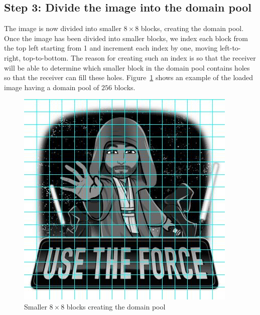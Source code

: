 \documentclass[10pt,twocolumn]{witseiepaper}
\begin{document}
\subsection{Step 3: Divide the image into the domain pool}
\label{sec: Step 3}
The image is now divided into smaller $8\times 8$ blocks, creating the domain pool. Once the image has been divided into smaller blocks, we index each block from the top left starting from 1 and increment each index by one, moving left-to-right, top-to-bottom. The reason for creating such an index is so that the receiver will be able to determine which smaller block in the domain pool contains holes so that the receiver can fill these holes. Figure~\ref{fig: Step 3} shows an example of the loaded image having a domain pool of $256$ blocks.
\begin{figure}[h!]
\renewcommand{\thefigure}{\arabic{figure}}
\centering
\includegraphics[scale=0.4, frame]{Step3.jpg}
\caption{Smaller $8\times 8$ blocks creating the domain pool}
\label{fig: Step 3}
\end{figure}
\end{document}

